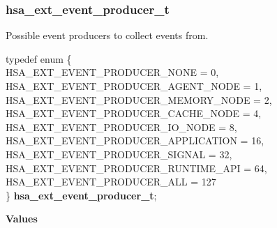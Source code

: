 \documentclass[final,oneside]{book}
\newcommand{\reftyp}[1]{#1}
\newcommand{\refenu}[1]{\reftyp{#1}}
\newenvironment{mylongtable}{\rowcolors{0}{lightgray}{lightgray}\longtable} {
\endlongtable}
\begin{document}
\subsubsection{hsa_\-ext_\-event_\-producer_\-t}
\vspace{-2.5mm}Possible event producers to collect events from.\begin{mylongtable}{@{}p{\textwidth}}
\rule{0pt}{3ex}typedef enum \{\\\hspace{1.7em}\hypertarget{group__ext-event-system_1gga56de005222a9d59668abf380a190c8e7a445d4f2d76a3f6d9d7467865080bd475}{\refenu{HSA_\-EXT_\-EVENT_\-PRODUCER_\-NONE}} = 0,\\
\hspace{1.7em}\hypertarget{group__ext-event-system_1gga56de005222a9d59668abf380a190c8e7a0f3783fb3cd30147a138b70ef6a1389b}{\refenu{HSA_\-EXT_\-EVENT_\-PRODUCER_\-AGENT_\-NODE}} = 1,\\
\hspace{1.7em}\hypertarget{group__ext-event-system_1gga56de005222a9d59668abf380a190c8e7a52b6a03193954460d9fc311133a1b580}{\refenu{HSA_\-EXT_\-EVENT_\-PRODUCER_\-MEMORY_\-NODE}} = 2,\\
\hspace{1.7em}\hypertarget{group__ext-event-system_1gga56de005222a9d59668abf380a190c8e7a685814b11a358ae8339b18dedea7e2d4}{\refenu{HSA_\-EXT_\-EVENT_\-PRODUCER_\-CACHE_\-NODE}} = 4,\\
\hspace{1.7em}\hypertarget{group__ext-event-system_1gga56de005222a9d59668abf380a190c8e7a7c214f36bd6ec7d95f1ed2a187e21b65}{\refenu{HSA_\-EXT_\-EVENT_\-PRODUCER_\-IO_\-NODE}} = 8,\\
\hspace{1.7em}\hypertarget{group__ext-event-system_1gga56de005222a9d59668abf380a190c8e7ab2623df9b27fcdd26ef5634567f560cd}{\refenu{HSA_\-EXT_\-EVENT_\-PRODUCER_\-APPLICATION}} = 16,\\
\hspace{1.7em}\hypertarget{group__ext-event-system_1gga56de005222a9d59668abf380a190c8e7a9dc097816a934aa69f0ba6b089c5d45f}{\refenu{HSA_\-EXT_\-EVENT_\-PRODUCER_\-SIGNAL}} = 32,\\
\hspace{1.7em}\hypertarget{group__ext-event-system_1gga56de005222a9d59668abf380a190c8e7a1923ce3f31cca8d6a928e6546718f719}{\refenu{HSA_\-EXT_\-EVENT_\-PRODUCER_\-RUNTIME_\-API}} = 64,\\
\hspace{1.7em}\hypertarget{group__ext-event-system_1gga56de005222a9d59668abf380a190c8e7a855a1ef2cf9611d08a69124f1860b15a}{\refenu{HSA_\-EXT_\-EVENT_\-PRODUCER_\-ALL}} = 127\\
\} \hypertarget{group__ext-event-system_1ga56de005222a9d59668abf380a190c8e7}{\textbf{hsa_\-ext_\-event_\-producer_\-t}};\rule[-2ex]{0pt}{0pt}\end{mylongtable}\noindent\textbf{Values}\\[-7mm]
\end{document}

